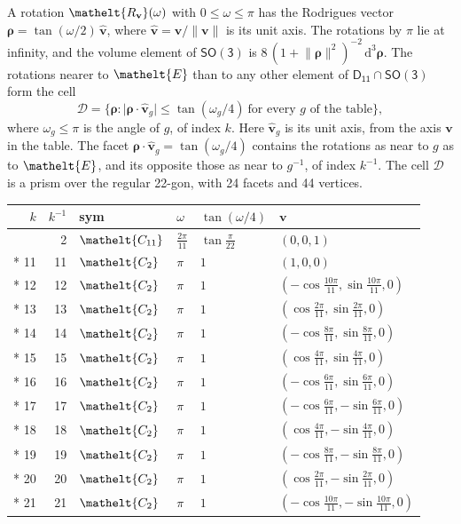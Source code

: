 \documentclass[10pt,a4paper]{article}
\numberwithin{equation}{section}
\newcommand{\eltfont}[1]{{\let\sigma\eltsigma\mathelt{#1}}}
\newcommand{\grp}[1]{\mathsf{#1}}
\newcommand{\cls}[1]{\eltfont{#1}}
\newcommand{\elt}[1]{\eltfont{#1}}
\newcommand{\dirvec}[3]{(#1, #2, #3)}
\newcommand{\unitaxis}{\hat{\mathbf{v}}}
\newcommand{\vv}{\mathbf{v}}
\newcommand{\diff}{\mathrm{d}}
\newcommand{\rodrigues}{\boldsymbol{\rho}}
\newcommand{\fcell}{\mathcal{D}}
\begin{document}
\leavevmode\label{n:vector.rodrigues}\label{n:vector.unitaxis}A rotation $\elt{R_{\vv}}(\omega)$ with $0 \le \omega \le \pi$ has the Rodrigues vector $\rodrigues = \tan(\omega/2)\,\unitaxis$, where $\unitaxis = \vv/\lVert\vv\rVert$ is its unit axis. The rotations by $\pi$ lie at infinity, and the volume element of \href{SO3.pdf}{$\grp{SO(3)}$} is $8\,(1 + \lVert\rodrigues\rVert^2)^{-2}\,\diff^3\rodrigues$.
\leavevmode\label{n:set.cell}The rotations nearer to $\elt{E}$ than to any other element of $\grp{D_{11}} \cap \grp{SO(3)}$ form the cell
\begin{equation}\label{e:cell}\fcell = \bigl\{\rodrigues : \lvert\rodrigues\cdot\unitaxis_g\rvert \le \tan(\omega_g/4)\ \text{for every $g$ of the table}\bigr\},\end{equation}
where $\omega_g \le \pi$ is the angle of $g$, of index $k$. Here $\unitaxis_g$ is its unit axis, from the axis $\vv$ in the table. The facet $\rodrigues\cdot\unitaxis_g = \tan(\omega_g/4)$ contains the rotations as near to $g$ as to $\elt{E}$, and its opposite those as near to $g^{-1}$, of index $k^{-1}$. The cell $\fcell$ is a prism over the regular 22-gon, with 24 facets and 44 vertices.
{\small{\renewcommand{\arraystretch}{1.3}\begin{longtable}{@{}rrllll@{}}\toprule
$k$ & $k^{-1}$ & sym & $\omega$ & $\tan(\omega/4)$ & $\vv$\\\midrule\endhead
\bottomrule\endfoot\endlastfoot
1 & 2 & $\cls{C_{11}}$ & $\tfrac{2\pi}{11}$ & $\tan\tfrac{\pi}{22}$ & $\dirvec{0}{0}{1}$\\*
11 & 11 & $\cls{C_{2}}$ & $\pi$ & $1$ & $\dirvec{1}{0}{0}$\\*
12 & 12 & $\cls{C_{2}}$ & $\pi$ & $1$ & $\dirvec{-\cos\tfrac{10\pi}{11}}{\sin\tfrac{10\pi}{11}}{0}$\\*
13 & 13 & $\cls{C_{2}}$ & $\pi$ & $1$ & $\dirvec{\cos\tfrac{2\pi}{11}}{\sin\tfrac{2\pi}{11}}{0}$\\*
14 & 14 & $\cls{C_{2}}$ & $\pi$ & $1$ & $\dirvec{-\cos\tfrac{8\pi}{11}}{\sin\tfrac{8\pi}{11}}{0}$\\*
15 & 15 & $\cls{C_{2}}$ & $\pi$ & $1$ & $\dirvec{\cos\tfrac{4\pi}{11}}{\sin\tfrac{4\pi}{11}}{0}$\\*
16 & 16 & $\cls{C_{2}}$ & $\pi$ & $1$ & $\dirvec{-\cos\tfrac{6\pi}{11}}{\sin\tfrac{6\pi}{11}}{0}$\\*
17 & 17 & $\cls{C_{2}}$ & $\pi$ & $1$ & $\dirvec{-\cos\tfrac{6\pi}{11}}{-\sin\tfrac{6\pi}{11}}{0}$\\*
18 & 18 & $\cls{C_{2}}$ & $\pi$ & $1$ & $\dirvec{\cos\tfrac{4\pi}{11}}{-\sin\tfrac{4\pi}{11}}{0}$\\*
19 & 19 & $\cls{C_{2}}$ & $\pi$ & $1$ & $\dirvec{-\cos\tfrac{8\pi}{11}}{-\sin\tfrac{8\pi}{11}}{0}$\\*
20 & 20 & $\cls{C_{2}}$ & $\pi$ & $1$ & $\dirvec{\cos\tfrac{2\pi}{11}}{-\sin\tfrac{2\pi}{11}}{0}$\\*
21 & 21 & $\cls{C_{2}}$ & $\pi$ & $1$ & $\dirvec{-\cos\tfrac{10\pi}{11}}{-\sin\tfrac{10\pi}{11}}{0}$\\
\bottomrule\end{longtable}}}
\end{document}
